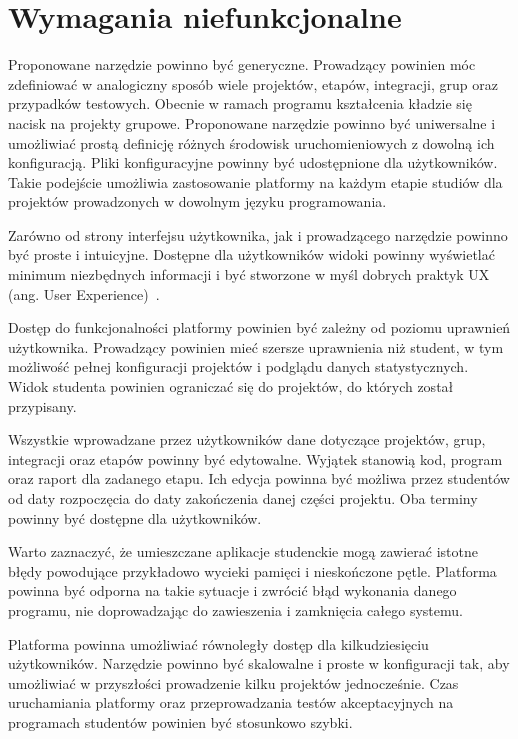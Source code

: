 \section{Wymagania niefunkcjonalne}

Proponowane narzędzie powinno być generyczne.
Prowadzący powinien móc zdefiniować w analogiczny sposób wiele projektów, etapów, integracji, grup oraz przypadków testowych.
Obecnie w ramach programu kształcenia kładzie się nacisk na projekty grupowe.
Proponowane narzędzie powinno być uniwersalne i umożliwiać prostą definicję różnych środowisk uruchomieniowych z dowolną ich konfiguracją.
Pliki konfiguracyjne powinny być udostępnione dla użytkowników.
Takie podejście umożliwia zastosowanie platformy na każdym etapie studiów dla projektów prowadzonych w dowolnym języku programowania.

Zarówno od strony interfejsu użytkownika, jak i prowadzącego narzędzie powinno być proste i intuicyjne.
Dostępne dla użytkowników widoki powinny wyświetlać minimum niezbędnych informacji i być stworzone w myśl dobrych praktyk UX (ang. User Experience)~\cite{ux-good-practicies}.

Dostęp do funkcjonalności platformy powinien być zależny od poziomu uprawnień użytkownika.
Prowadzący powinien mieć szersze uprawnienia niż student, w tym możliwość pełnej konfiguracji projektów i podglądu danych statystycznych.
Widok studenta powinien ograniczać się do projektów, do których został przypisany.

Wszystkie wprowadzane przez użytkowników dane dotyczące projektów, grup, integracji oraz etapów powinny być edytowalne.
Wyjątek stanowią kod, program oraz raport dla zadanego etapu.
Ich edycja powinna być możliwa przez studentów od daty rozpoczęcia do daty zakończenia danej części projektu.
Oba terminy powinny być dostępne dla użytkowników.

Warto zaznaczyć, że umieszczane aplikacje studenckie mogą zawierać istotne błędy powodujące przykładowo wycieki pamięci i nieskończone pętle.
Platforma powinna być odporna na takie sytuacje i zwrócić błąd wykonania danego programu, nie doprowadzając do zawieszenia i zamknięcia całego systemu.

Platforma powinna umożliwiać równoległy dostęp dla kilkudziesięciu użytkowników.
Narzędzie powinno być skalowalne i proste w konfiguracji tak, aby umożliwiać w przyszłości prowadzenie kilku projektów jednocześnie.
Czas uruchamiania platformy oraz przeprowadzania testów akceptacyjnych na programach studentów powinien być stosunkowo szybki.

